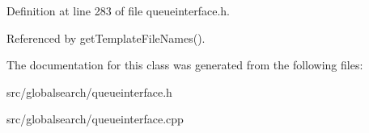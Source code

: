 Definition at line 283 of file queueinterface.\+h.



Referenced by get\+Template\+File\+Names().



The documentation for this class was generated from the following files\+:\begin{DoxyCompactItemize}
\item 
src/globalsearch/queueinterface.\+h\item 
src/globalsearch/queueinterface.\+cpp\end{DoxyCompactItemize}

